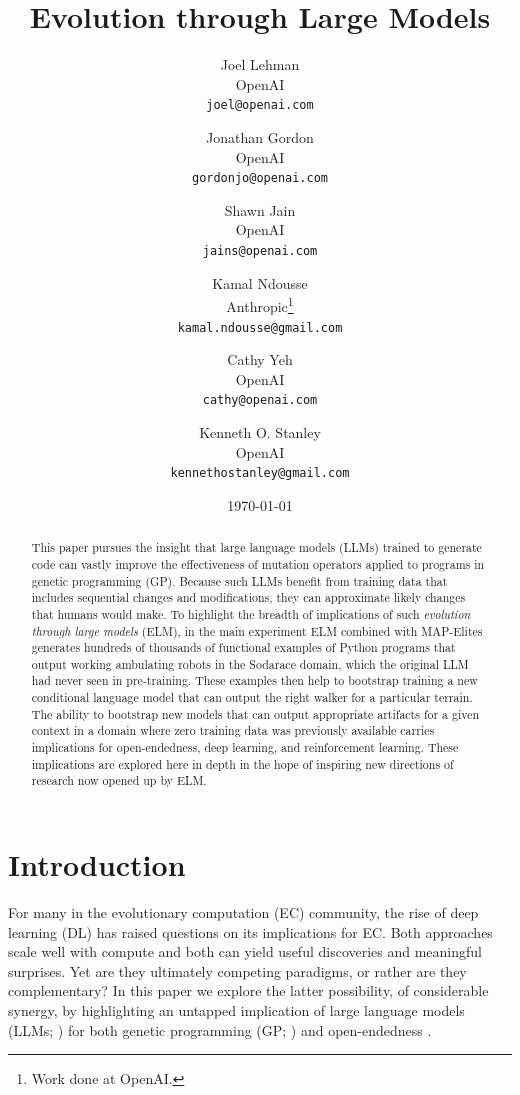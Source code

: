 \documentclass{article}
\title{Evolution through Large Models}
\author{
  Joel Lehman\\
  OpenAI \\
  \texttt{joel@openai.com}
  \and
  Jonathan Gordon\\
  OpenAI \\
  \texttt{gordonjo@openai.com}
  \and
  Shawn Jain\\
  OpenAI\\
  \texttt{jains@openai.com}
  \and
  Kamal Ndousse\\
  Anthropic\footnote{Work done at OpenAI.}\\
  \texttt{kamal.ndousse@gmail.com}
  \and
  Cathy Yeh\\
  OpenAI\\
  \texttt{cathy@openai.com}
  \and
  Kenneth O. Stanley\\
  OpenAI\\
  \texttt{kennethostanley@gmail.com}
}
\date{\today}
\begin{document}
\maketitle

\begin{abstract}
This paper pursues the insight that large language models (LLMs) trained to generate code can vastly improve the effectiveness of mutation operators applied to programs in genetic programming (GP).  Because such LLMs benefit from training data that includes sequential changes and modifications, they can approximate likely changes that humans would make.  To highlight the breadth of implications of such \emph{evolution through large models} (ELM), in the main experiment ELM combined with MAP-Elites generates hundreds of thousands of functional examples of Python programs that output working ambulating robots in the Sodarace domain, which the original LLM had never seen in pre-training.  These examples then help to bootstrap training a new conditional language model that can output the right walker for a particular terrain.  The ability to bootstrap new models that can output appropriate artifacts for a given context in a domain where zero training data was previously available carries implications for open-endedness, deep learning, and reinforcement learning.  These implications are explored here in depth in the hope of inspiring new directions of research now opened up by ELM.

\end{abstract}

\section{Introduction}






For many in the evolutionary computation (EC) community, the rise of deep learning (DL) has raised questions on its implications for EC.  Both approaches scale well with compute and both can yield useful discoveries and meaningful surprises.  Yet are they ultimately competing paradigms, or rather are they complementary?  In this paper we explore the latter possibility,
of considerable synergy, by highlighting an untapped implication of large language models (LLMs; \cite{bommasani2021opportunities,brown2020language}) for both genetic programming (GP; \cite{koza:book92,banzhaf1998genetic}) and open-endedness \cite{stanley:open,standish:ijcia03,bedau:alife00a}. 
\end{document}
